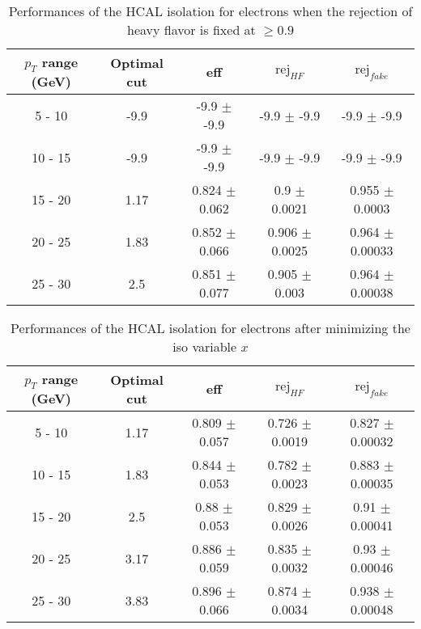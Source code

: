 \begin{table}[htbp]
   \centering
   \begin{tabular}{|c|c|c|c|c|}
      \hline
      $p_T$ range (GeV) & Optimal cut & eff & $\textrm{rej}_{HF}$ & $\textrm{rej}_{fake}$ \\
      \hline
      5 - 10 & -9.9 & -9.9 $\pm$ -9.9 & -9.9 $\pm$ -9.9 & -9.9 $\pm$ -9.9 \\
      \hline
      10 - 15 & -9.9 & -9.9 $\pm$ -9.9 & -9.9 $\pm$ -9.9 & -9.9 $\pm$ -9.9 \\
      \hline
      15 - 20 & 1.17 & 0.824 $\pm$ 0.062 & 0.9 $\pm$ 0.0021 & 0.955 $\pm$ 0.0003 \\
      \hline
      20 - 25 & 1.83 & 0.852 $\pm$ 0.066 & 0.906 $\pm$ 0.0025 & 0.964 $\pm$ 0.00033 \\
      \hline
      25 - 30 & 2.5 & 0.851 $\pm$ 0.077 & 0.905 $\pm$ 0.003 & 0.964 $\pm$ 0.00038 \\
      \hline
   \end{tabular}
   \caption{\small{Performances of the HCAL isolation for electrons when the rejection of heavy flavor is fixed at $\geq 0.9$}\label{tab:hcal_elec_pureHf}}
\end{table}






\begin{table}[htbp]
   \centering
   \begin{tabular}{|c|c|c|c|c|}
      \hline
      $p_T$ range (GeV) & Optimal cut & eff & $\textrm{rej}_{HF}$ & $\textrm{rej}_{fake}$ \\
      \hline
      5 - 10 & 1.17 & 0.809 $\pm$ 0.057 & 0.726 $\pm$ 0.0019 & 0.827 $\pm$ 0.00032 \\
      \hline
      10 - 15 & 1.83 & 0.844 $\pm$ 0.053 & 0.782 $\pm$ 0.0023 & 0.883 $\pm$ 0.00035 \\
      \hline
      15 - 20 & 2.5 & 0.88 $\pm$ 0.053 & 0.829 $\pm$ 0.0026 & 0.91 $\pm$ 0.00041 \\
      \hline
      20 - 25 & 3.17 & 0.886 $\pm$ 0.059 & 0.835 $\pm$ 0.0032 & 0.93 $\pm$ 0.00046 \\
      \hline
      25 - 30 & 3.83 & 0.896 $\pm$ 0.066 & 0.874 $\pm$ 0.0034 & 0.938 $\pm$ 0.00048 \\
      \hline
   \end{tabular}
   \caption{\small{Performances of the HCAL isolation for electrons after minimizing the iso variable $x$}\label{tab:hcal_elec_opt}}
\end{table}







